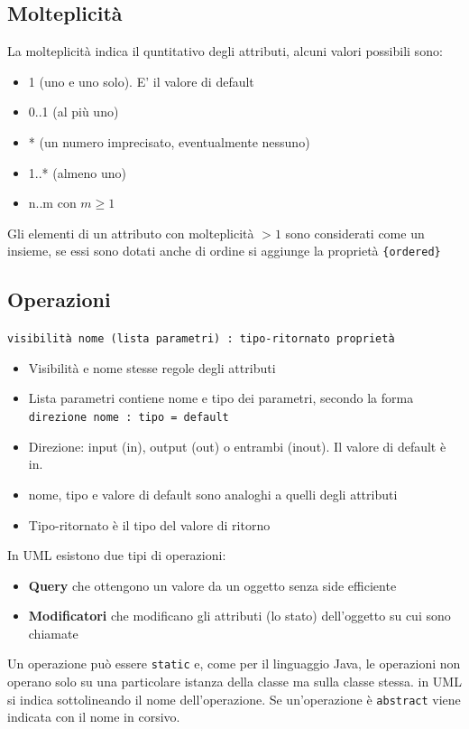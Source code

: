 \documentclass[12pt, a4paper]{report}
\begin{document}
\subsection{Molteplicità}
La molteplicità indica il quntitativo degli attributi, alcuni valori possibili sono:
\begin{itemize}
    \item 1 (uno e uno solo). E' il valore di default
    \item 0..1 (al più uno)
    \item * (un numero imprecisato, eventualmente nessuno)
    \item 1..* (almeno uno)
    \item n..m con $m\geq 1$
\end{itemize}
Gli elementi di un attributo con molteplicità $>1$ sono considerati come un insieme, se essi sono dotati anche di ordine si aggiunge la proprietà \texttt{\{ordered\}}
\subsection{Operazioni}
\begin{center}
    \texttt{visibilità nome (lista parametri) : tipo-ritornato {proprietà}}
\end{center}
\begin{itemize}
    \item Visibilità e nome stesse regole degli attributi
    \item Lista parametri contiene nome e tipo dei parametri, secondo la forma \texttt{direzione nome : tipo = default}
    \item Direzione: input (in), output (out) o entrambi (inout). Il valore di default è in.
    \item nome, tipo e valore di default sono analoghi a quelli degli attributi
    \item Tipo-ritornato è il tipo del valore di ritorno
\end{itemize}
In UML esistono due tipi di operazioni:
\begin{itemize}
    \item \textbf{Query} che ottengono un valore da un oggetto senza side efficiente
    \item \textbf{Modificatori} che modificano gli attributi (lo stato) dell'oggetto su cui sono chiamate
\end{itemize}
Un operazione può essere \texttt{static} e, come per il linguaggio Java, le operazioni non operano solo su una particolare istanza della classe ma sulla classe stessa. in UML si indica sottolineando il nome dell'operazione.
Se un'operazione è \texttt{abstract} viene indicata con il nome in corsivo.
\end{document}
